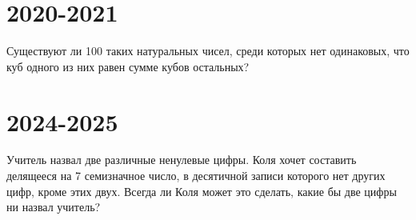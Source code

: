 \documentclass[11pt, a4paper]{problems_template}
\begin{document}
\chapter{2020-2021}

\begin{exercise}
Существуют ли 100 таких натуральных чисел, среди которых нет одинаковых, что куб одного из них равен сумме кубов остальных?
\end{exercise}

\chapter{2024-2025}

\begin{exercise}
Учитель назвал две различные ненулевые цифры. Коля хочет составить делящееся на 7 семизначное число, в десятичной записи которого нет других цифр, кроме этих двух. Всегда ли Коля может это сделать, какие бы две цифры ни назвал учитель?
\end{exercise}
\end{document}

